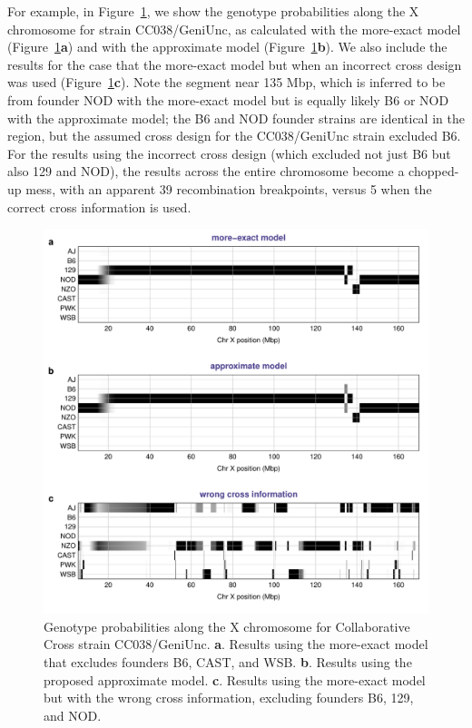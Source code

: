 \documentclass[12pt,letterpaper]{article}\usepackage[]{graphicx}\usepackage[table]{xcolor}
\begin{document}
For example, in Figure~\ref{fig4_cc_xchr}, we show the genotype
probabilities along the X chromosome for strain CC038/GeniUnc, as calculated with
the more-exact model (Figure~\ref{fig4_cc_xchr}\textbf{a}) and with the approximate
model (Figure~\ref{fig4_cc_xchr}\textbf{b}). We also include the results for
the case that the more-exact model but when an incorrect cross design was used
(Figure~\ref{fig4_cc_xchr}\textbf{c}). Note the segment near 135 Mbp, which is
inferred to be from founder NOD with the more-exact model but is equally likely B6
or NOD with the approximate model; the B6 and NOD founder strains are
identical in the region, but the assumed cross design for the
CC038/GeniUnc strain excluded B6. For the results using the incorrect
cross design (which excluded not just B6 but also 129 and NOD), the
results across the entire chromosome become a chopped-up mess,
with an apparent 39 recombination breakpoints, versus
5 when the correct cross information is used.

\begin{figure}
\centering
\includegraphics[width=\textwidth]{Figs/fig4_cc_xchr.pdf}

\caption{Genotype probabilities along the X chromosome for Collaborative
  Cross strain CC038/GeniUnc. \textbf{a}. Results using
  the more-exact model that excludes founders
  B6, CAST, and WSB.
  \textbf{b}. Results using the proposed approximate model.
  \textbf{c}. Results using the more-exact model but with the wrong
  cross information, excluding founders
  B6, 129, and NOD.
  \label{fig4_cc_xchr}}
\end{figure}
\end{document}
